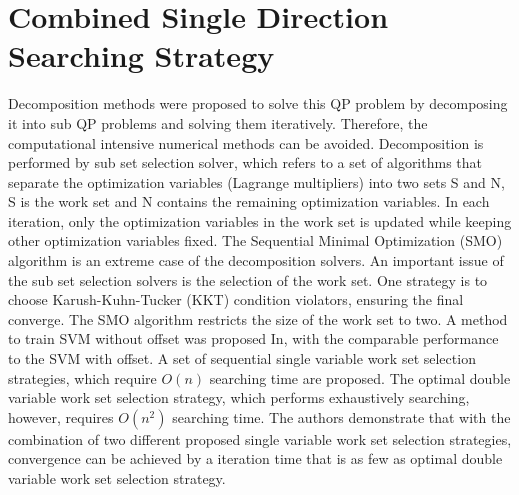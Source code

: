 \section{Combined Single Direction Searching Strategy}
Decomposition methods were proposed to solve this QP problem by decomposing it into sub QP problems and solving them iteratively\cite{platt1999fast}. Therefore, the computational intensive numerical methods can be avoided. Decomposition is performed by sub set selection solver, which refers to a set of algorithms that separate the optimization variables (Lagrange multipliers) into two sets S and N, S is the work set and N contains the remaining optimization variables. In each iteration, only the optimization variables in the work set is updated while keeping other optimization variables fixed. The Sequential Minimal Optimization (SMO) algorithm\cite{platt1999fast} is an extreme case of the decomposition solvers. An important issue of the sub set selection solvers is the selection of the work set. One strategy is to choose Karush-Kuhn-Tucker (KKT) condition violators, ensuring the final converge\cite{osuna1997improved}. The SMO algorithm restricts the size of the work set to two. A method to train SVM without offset was proposed In\cite{steinwart2011training}, with the comparable performance to the SVM with offset. A set of sequential single variable work set selection strategies, which require $O(n)$ searching time are proposed. The optimal double variable work set selection strategy, which performs exhaustively searching, however, requires $O(n^{2})$ searching time. The authors demonstrate that with the combination of two different proposed single variable work set selection strategies, convergence can be achieved by a iteration time that is as few as optimal double variable work set selection strategy.

